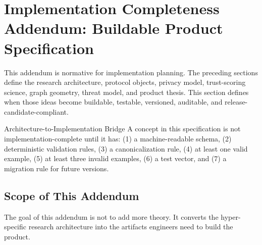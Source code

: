 \documentclass[11pt]{article}
\begin{document}
\section{Implementation Completeness Addendum: Buildable Product Specification}

This addendum is normative for implementation planning. The preceding sections define the research architecture, protocol objects, privacy model, trust-scoring science, graph geometry, threat model, and product thesis. This section defines when those ideas become buildable, testable, versioned, auditable, and release-candidate-compliant.

\begin{principlebox}{Architecture-to-Implementation Bridge}
A concept in this specification is not implementation-complete until it has: (1) a machine-readable schema, (2) deterministic validation rules, (3) a canonicalization rule, (4) at least one valid example, (5) at least three invalid examples, (6) a test vector, and (7) a migration rule for future versions.
\end{principlebox}

\subsection{Scope of This Addendum}

The goal of this addendum is not to add more theory. It converts the hyper-specific research architecture into the artifacts engineers need to build the product.
\end{document}
